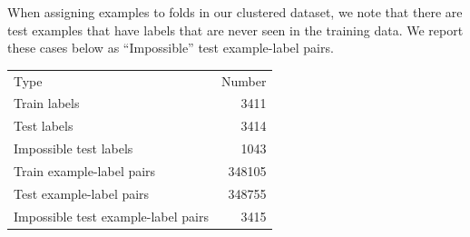 When assigning examples to folds in our clustered dataset, we note that there are test examples that have labels that are never seen in the training data. We report these cases below as ``Impossible'' test example-label pairs.
\begin{table}[htbp]
\centering
\begin{tabular}{|l|r|}
\hline
                                Type &  Number \\
\Xhline{2pt}
                        Train labels &    3411 \\
\hline
                         Test labels &    3414 \\
\hline
              Impossible test labels &    1043 \\
\hline
           Train example-label pairs &  348105 \\
\hline
            Test example-label pairs &  348755 \\
\hline
 Impossible test example-label pairs &    3415 \\
\hline
\end{tabular}
\end{table}


